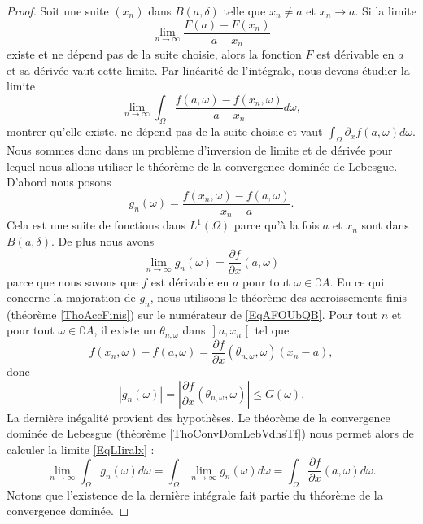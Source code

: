 \begin{proof}
    Soit une suite \( (x_n)\) dans \( B(a,\delta)\) telle que \( x_n\neq a\) et \( x_n\to a\). Si la limite
    \begin{equation}
        \lim_{n\to \infty} \frac{ F(a)-F(x_n) }{ a-x_n }
    \end{equation}
    existe et ne dépend pas de la suite choisie, alors la fonction \( F\) est dérivable en \( a\) et sa dérivée vaut cette limite. Par linéarité de l'intégrale, nous devons étudier la limite
    \begin{equation}    \label{EqLIiralx}
        \lim_{n\to \infty} \int_{\Omega}\frac{ f(a,\omega)-f(x_n,\omega) }{ a-x_n }d\omega,
    \end{equation}
    montrer qu'elle existe, ne dépend pas de la suite choisie et vaut \( \int_{\Omega}\partial_xf(a,\omega)d\omega\). Nous sommes donc dans un problème d'inversion de limite et de dérivée pour lequel nous allons utiliser le théorème de la convergence dominée de Lebesgue. D'abord nous posons
    \begin{equation}    \label{EqAFOUbQB}
        g_n(\omega)=\frac{ f(x_n,\omega)-f(a,\omega) }{ x_n-a }.
    \end{equation}
    Cela est une suite de fonctions dans \( L^1(\Omega)\) parce qu'à la fois \( a\) et \( x_n\) sont dans \( B(a,\delta)\). De plus nous avons
    \begin{equation}
        \lim_{n\to \infty} g_n(\omega)=\frac{ \partial f }{ \partial x }(a,\omega)
    \end{equation}
    parce que nous savons que \( f\) est dérivable en \( a\) pour tout \( \omega\in\complement A\). En ce qui concerne la majoration de \( g_n\), nous utilisons le théorème des accroissements finis (théorème \ref{ThoAccFinis}) sur le numérateur de \eqref{EqAFOUbQB}. Pour tout \( n\) et pour tout \( \omega\in \complement A\), il existe un \( \theta_{n,\omega}\) dans \( \mathopen] a , x_n \mathclose[\) tel que
        \begin{equation}
            f(x_n,\omega)-f(a,\omega)=\frac{ \partial f }{ \partial x }(\theta_{n,\omega},\omega)(x_n-a),
        \end{equation}
        donc
        \begin{equation}
            | g_n(\omega) |=\left| \frac{ \partial f }{ \partial x }(\theta_{n,\omega},\omega) \right| \leq G(\omega).
        \end{equation}
        La dernière inégalité provient des hypothèses. Le théorème de la convergence dominée de Lebesgue (théorème \ref{ThoConvDomLebVdhsTf}) nous permet alors de calculer la limite \eqref{EqLIiralx} :
        \begin{equation}
            \lim_{n\to \infty} \int_{\Omega}g_n(\omega)d\omega=\int_{\Omega}\lim_{n\to \infty} g_n(\omega)d\omega=\int_{\Omega}\frac{ \partial f }{ \partial x }(a,\omega)d\omega.
        \end{equation}
        Notons que l'existence de la dernière intégrale fait partie du théorème de la convergence dominée.


\end{proof}
